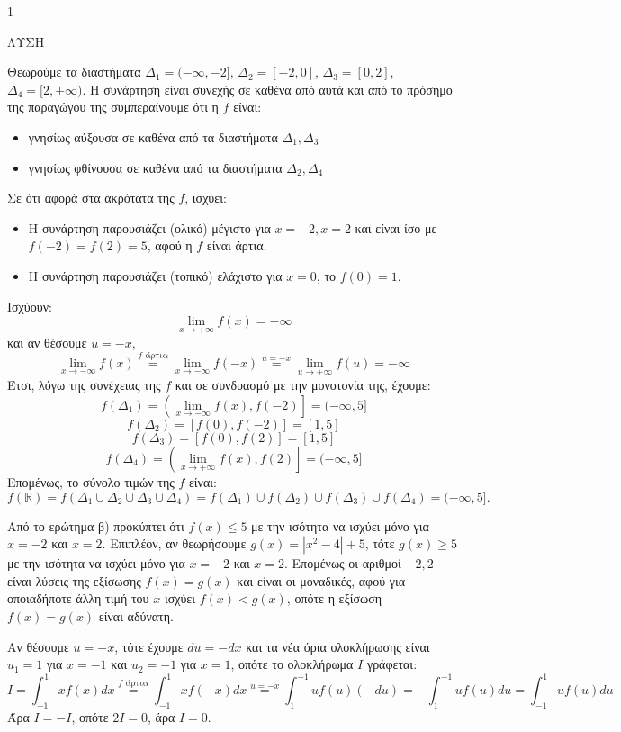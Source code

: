 \begin{ylh}{1}
    \item [Ύλη από εικόνα]
\end{ylh}
ΛΥΣΗ
\begin{alist}
    \item Θεωρούμε τα διαστήματα $\Delta_1 = (-\infty, -2]$, $\Delta_2 = [-2, 0]$, $\Delta_3 = [0, 2]$, $\Delta_4 = [2, +\infty)$. Η συνάρτηση είναι συνεχής σε καθένα από αυτά και από το πρόσημο της παραγώγου της συμπεραίνουμε ότι η $f$ είναι:
    \begin{itemize}
        \item γνησίως αύξουσα σε καθένα από τα διαστήματα $\Delta_1, \Delta_3$
        \item γνησίως φθίνουσα σε καθένα από τα διαστήματα $\Delta_2, \Delta_4$
    \end{itemize}
    Σε ότι αφορά στα ακρότατα της $f$, ισχύει:
    \begin{itemize}
        \item Η συνάρτηση παρουσιάζει (ολικό) μέγιστο για $x=-2, x=2$ και είναι ίσο με $f(-2)=f(2)=5$, αφού η $f$ είναι άρτια.
        \item Η συνάρτηση παρουσιάζει (τοπικό) ελάχιστο για $x=0$, το $f(0)=1$.
    \end{itemize}

    \item Ισχύουν:
    \[ \lim_{x \to +\infty} f(x) = -\infty \]
    και αν θέσουμε $u=-x$,
    \[ \lim_{x \to -\infty} f(x) \overset{f \text{ άρτια}}{=} \lim_{x \to -\infty} f(-x) \overset{u=-x}{=} \lim_{u \to +\infty} f(u) = -\infty \]
    Έτσι, λόγω της συνέχειας της $f$ και σε συνδυασμό με την μονοτονία της, έχουμε:
    \[ f(\Delta_1) = \left(\lim_{x \to -\infty} f(x), f(-2)\right] = (-\infty, 5] \]
    \[ f(\Delta_2) = [f(0), f(-2)] = [1, 5] \]
    \[ f(\Delta_3) = [f(0), f(2)] = [1, 5] \]
    \[ f(\Delta_4) = \left(\lim_{x \to +\infty} f(x), f(2)\right] = (-\infty, 5] \]
    Επομένως, το σύνολο τιμών της $f$ είναι:
    \[ f(\mathbb{R}) = f(\Delta_1 \cup \Delta_2 \cup \Delta_3 \cup \Delta_4) = f(\Delta_1) \cup f(\Delta_2) \cup f(\Delta_3) \cup f(\Delta_4) = (-\infty, 5]. \]

    \item Από το ερώτημα β) προκύπτει ότι $f(x) \le 5$ με την ισότητα να ισχύει μόνο για $x=-2$ και $x=2$. Επιπλέον, αν θεωρήσουμε $g(x)=|x^2-4|+5$, τότε $g(x) \ge 5$ με την ισότητα να ισχύει μόνο για $x=-2$ και $x=2$.
    Επομένως οι αριθμοί $-2, 2$ είναι λύσεις της εξίσωσης $f(x)=g(x)$ και είναι οι μοναδικές, αφού για οποιαδήποτε άλλη τιμή του $x$ ισχύει $f(x)<g(x)$, οπότε η εξίσωση $f(x)=g(x)$ είναι αδύνατη.

    \item Αν θέσουμε $u=-x$, τότε έχουμε $du=-dx$ και τα νέα όρια ολοκλήρωσης είναι $u_1=1$ για $x=-1$ και $u_2=-1$ για $x=1$, οπότε το ολοκλήρωμα $I$ γράφεται:
    \[ I = \int_{-1}^{1} xf(x)dx \overset{f \text{ άρτια}}{=} \int_{-1}^{1} xf(-x)dx \overset{u=-x}{=} \int_{1}^{-1} u f(u)(-du) = -\int_{1}^{-1} uf(u)du = \int_{-1}^{1} uf(u)du \]
    Άρα $I = -I$, οπότε $2I=0$, άρα $I=0$.
\end{alist}